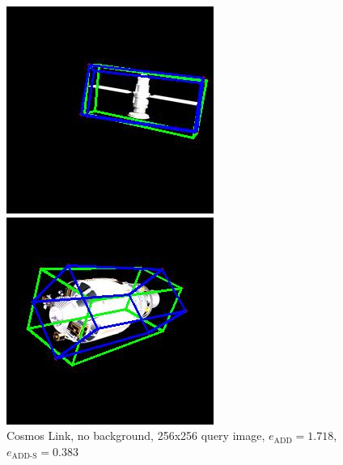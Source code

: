 \bigskip
\bigskip

\begin{figure}[h]
    \centering
    \begin{minipage}{0.45\linewidth}
        \centering
        \includegraphics[width=\linewidth]{data/fig5.jpg} %
        \caption{Cosmos Link, no background, 256x256 query image, $e_\mathrm{ADD}=1.718$, $e_{\mathrm{ADD}\text{-}\mathrm{S}}=0.383$ }
        \label{fig:fig5}
    \end{minipage}\hfill
    \begin{minipage}{0.45\linewidth}
        \centering
        \includegraphics[width=\linewidth]{data/fig6.jpg} %

\end{minipage}
\end{figure}
